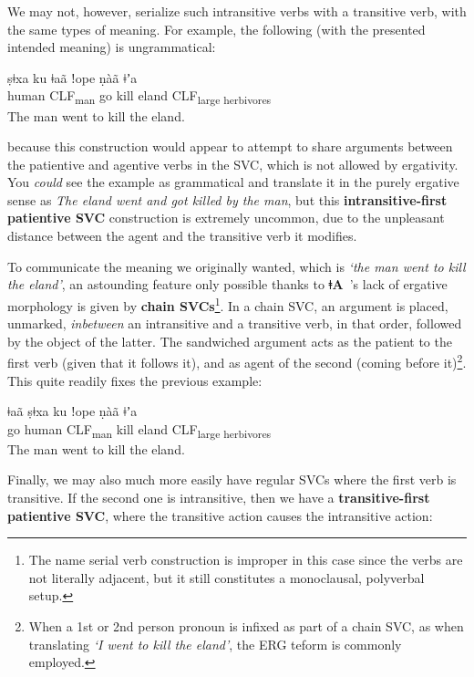 \documentclass[11pt]{book}
\newcommand{\qcn}[1]{\textbf{#1}}
\newcommand{\langname}{\qcn{ǂA}~}
\newcommand{\transl}[2]{\qcn{#1} \emph{#2}}
\newcommand{\grammsc}[1]{\textsc{#1}}
\newcommand{\CLF}[1]{\grammsc{CLF}\textsubscript{#1}}
\newcommand{\ERG}{\grammsc{ERG}}
\begin{document}
We may not, however, serialize such intransitive verbs with a transitive verb, with the same types of meaning. For example, the following (with the presented intended meaning) is ungrammatical:

\begin{exe}
\ex
\gll *ṣǂxa ku ǂaã ǃope ṇàã ǂʼa \\
human \CLF{man} go kill eland \CLF{large herbivores}\\
\glt *The man went to kill the eland.
\end{exe}

because this construction would appear to attempt to share arguments between the patientive and agentive verbs in the SVC, which is not allowed by ergativity. You \emph{could} see the example as grammatical and translate it in the purely ergative sense as \transl{}{The eland went and got killed by the man}, but this \textbf{intransitive-first patientive SVC} construction is extremely uncommon, due to the unpleasant distance between the agent and the transitive verb it modifies. 

To communicate the meaning we originally wanted, which is \emph{`the man went to kill the eland'}, an astounding feature only possible thanks to \langname's lack of ergative morphology is given by \textbf{chain SVCs}\footnote{The name serial verb construction is improper in this case since the verbs are not literally adjacent, but it still constitutes a monoclausal, polyverbal setup.}. In a chain SVC, an argument is placed, unmarked, \emph{inbetween} an intransitive and a transitive verb, in that order, followed by the object of the latter. The sandwiched argument acts as the patient to the first verb (given that it follows it), and as agent of the second (coming before it)\footnote{When a 1st or 2nd person pronoun is infixed as part of a chain SVC, as when translating \emph{`I went to kill the eland'}, the \ERG{} teform is commonly employed.}. This quite readily fixes the previous example:

\begin{exe}
\ex
\gll ǂaã ṣǂxa ku  ǃope ṇàã ǂʼa \\
go human \CLF{man} kill eland \CLF{large herbivores}\\
\glt The man went to kill the eland.
\end{exe}

Finally, we may also much more easily have regular SVCs where the first verb is transitive. If the second one is intransitive, then we have a \textbf{transitive-first patientive SVC}, where the transitive action causes the intransitive action:
\end{document}
